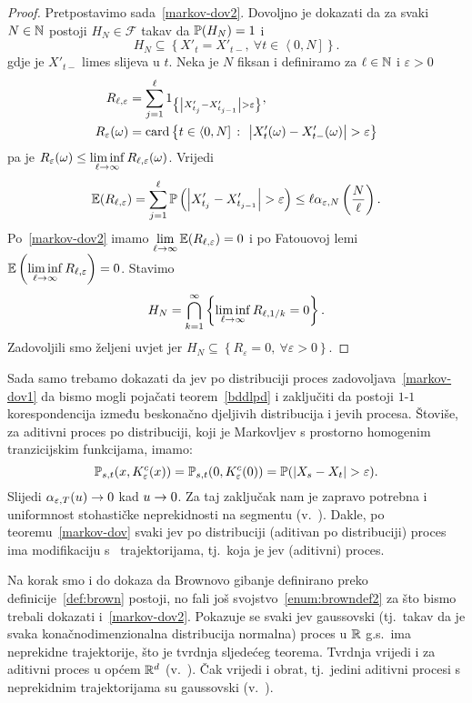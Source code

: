 \documentclass[main.tex]{subfiles}
\begin{document}
\begin{proof}
	Pretpostavimo sada~\eqref{markov-dov2}. Dovoljno je dokazati da za svaki \( N \in \N \)
	postoji \( H_N \in \mathcal F \) takav da \( \P(H_N)=1 \) i
	\[
		H_N \subseteq \left\{ X'_t = X'_{t-}, \ \forall t \in \left\langle 0,N \right] \right\}.
	\]
	gdje je \( X'_{t-} \) limes slijeva u \( t \). Neka je \( N \) fiksan i definiramo za \( \ell \in \N \) i \( \varepsilon > 0 \)
	\begin{align}
		R_{\ell, \varepsilon}   & = \sum_{j=1}^\ell 1_{\left\{ \abs{X'_{t_j}-X'_{t_{j-1}}} > \varepsilon \right\}},                           \\
		R_{\varepsilon}(\omega) & = \card \left\{ t \in \left\langle0, N\right] \st \abs{X'_t(\omega)-X'_{t-}(\omega)} > \varepsilon \right\}
	\end{align}
	pa je \( R_\varepsilon(\omega) \le \liminf\limits_{\ell \ub} R_{\ell, \varepsilon}(\omega) \). Vrijedi
	\begin{equation}
		\E(R_{\ell, \varepsilon}) =
		\sum_{j=1}^\ell \P\left(\abs{X'_{t_j} - X'_{t_{j-1}}} > \varepsilon\right) \le \ell \alpha_{\varepsilon, N}\left( \frac N\ell \right).
	\end{equation}
	Po~\eqref{markov-dov2} imamo \( \lim\limits_{\ell \ub} \E(R_{\ell, \varepsilon}) = 0 \) i po Fatouovoj lemi \( \E\left(\liminf\limits_{\ell \ub} R_{\ell, \varepsilon}\right) = 0 \). Stavimo
	\[
		H_N = \bigcap_{k=1}^\infty \left\{ \liminf\limits_{\ell \ub} R_{\ell, 1/k} = 0 \right\}.
	\]
	Zadovoljili smo željeni uvjet jer \( H_N \subseteq \left\{ R_\varepsilon = 0, \ \forall \varepsilon > 0 \right\} \).
\end{proof}
\bigskip
Sada samo trebamo dokazati da \levy jev po distribuciji proces zadovoljava~\eqref{markov-dov1} da
bismo mogli pojačati teorem~\ref{bddlpd} i zaključiti da postoji \( 1 \)-\( 1 \)
korespondencija između beskonačno djeljivih distribucija i \levy jevih procesa. Štoviše, za aditivni
proces po distribuciji, koji je Markovljev s prostorno homogenim tranzicijskim funkcijama, imamo:
\[
	\Ptrans_{s, t}(x, K_\varepsilon^c(x)) = \Ptrans_{s, t}(0, K_\varepsilon^c(0)) = \P(\abs{X_s-X_t} > \varepsilon).
\]
Slijedi \( \alpha_{\varepsilon, T}(u) \un \) kad \( u \un \). Za taj zaključak nam je zapravo
potrebna i uniformnost stohastičke neprekidnosti na segmentu (v.~\cite[lema~9.6]{sato}). Dakle, po
teoremu~\ref{markov-dov} svaki \levy jev po distribuciji (aditivan po distribuciji)
proces ima modifikaciju s \cadlag \ trajektorijama, tj.\ koja je \levy jev (aditivni) proces.

Na korak smo i do dokaza da Brownovo gibanje definirano preko definicije~\ref{def:brown} postoji, no fali još svojstvo~\ref{enum:browndef2} za što bismo trebali dokazati
i~\eqref{markov-dov2}. Pokazuje se svaki \levy jev gaussovski (tj.\ takav da
je svaka konačnodimenzionalna distribucija normalna) proces u \( \R \) g.s.\ ima neprekidne trajektorije,
što je tvrdnja sljedećeg teorema. Tvrdnja vrijedi i za aditivni proces u općem \( \R^d \) (v.~\cite[tm.~11.7]{sato}). Čak vrijedi i obrat, tj.\ jedini aditivni procesi s neprekidnim trajektorijama su gaussovski (v.~\cite[]{sato}).
\end{document}
